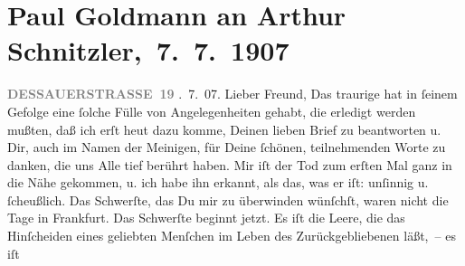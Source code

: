 

         
         \renewcommand{\erwaehntePersonen}{Personen: Clementine Goldmann, Fedor Mamroth, Olga Schnitzler}
         \renewcommand{\erwaehnteOrte}{Orte: Berlin, Dessauer Straße, Frankfurt am Main, Marienbad, Wien}
         \renewcommand{\erwaehnteWerke}{}
               \section[ Paul Goldmann an Arthur Schnitzler, 7. 7. 1907]{ Paul Goldmann an Arthur Schnitzler, 7. 7. 1907}\nopagebreak{}\rehead{ }\begin{ledgroupsized}[t]{13cm}\normalsize\beginnumbering \toendnotes[C]{\smallbreak\pagebreak[2]} 
\toendnotes[C]{\smallbreak}\pstart
           \noindent{}\raggedleft{}{\pb}\textcolor{gray}{\textbf{DESSAUERSTRASSE 19}}\pend
           . 7. 07.\pend
           \pstart{}Lieber Freund,\pend\pstart
           Das traurige \label{K-L03254-1v}\label{K-L03254-1h} hat in
               ſeinem Gefolge eine ſolche Fülle von Angelegenheiten gehabt, die erledigt werden
               mußten, daß ich erſt heut dazu komme, Deinen lieben
               Brief zu beantworten u. Dir, auch im Namen der Meinigen, für Deine ſchönen,
               teilnehmenden Worte zu danken, die uns Alle tief berührt haben.\pend
           \pstart
           Mir iſt der Tod
               zum erſten Mal ganz in die Nähe gekommen, {\pb}u. ich
               habe ihn erkannt, als das, was er iſt: unſinnig u. ſcheußlich.\pend
           \pstart
           Das Schwerſte, das Du mir zu überwinden wünſchſt, waren nicht die Tage in Frankfurt. Das Schwerſte beginnt jetzt. Es iſt die
               Leere, die das Hinſcheiden eines geliebten Menſchen im Leben des Zurückgebliebenen läßt, – es iſt

\end{ledgroupsized}
